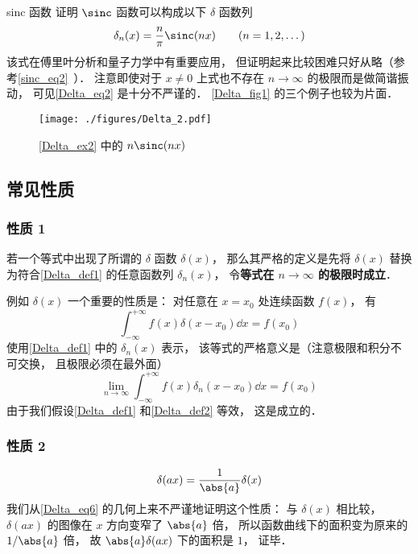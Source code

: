 \begin{example}{sinc 函数}\label{Delta_ex2}
证明 $\sinc$ 函数可以构成以下 $\delta$ 函数列
\begin{equation}\label{Delta_eq10}
\delta_n(x) = \frac{n}{\pi}\sinc(n x) \qquad (n = 1, 2, \dots)
\end{equation}
该式在傅里叶分析和量子力学中有重要应用\cite{Arfken}， 但证明起来比较困难只好从略（参考\autoref{sinc_eq2}~）． 注意即使对于 $x \ne 0$ 上式也不存在 $n\to\infty$ 的极限而是做简谐振动， 可见\autoref{Delta_eq2} 是十分不严谨的． \autoref{Delta_fig1} 的三个例子也较为片面．
\end{example}
\begin{figure}[ht]
\centering
\texttt{[image: ./figures/Delta\_2.pdf]}
\caption{\autoref{Delta_ex2} 中的 $n\sinc(n x)$} \label{Delta_fig2}
\end{figure}

\subsection{常见性质}
\subsubsection{性质 1}
若一个等式中出现了所谓的 $\delta$ 函数 $\delta(x)$， 那么其严格的定义是先将 $\delta(x)$ 替换为符合\autoref{Delta_def1} 的任意函数列 $\delta_n(x)$， 令\textbf{等式在 $n\to\infty$ 的极限时成立}．

例如 $\delta(x)$ 一个重要的性质是： 对任意在 $x = x_0$ 处连续函数 $f(x)$， 有
\begin{equation}\label{Delta_eq7}
\int_{-\infty}^{+\infty} f(x) \delta(x - x_0) \dd{x}= f(x_0)
\end{equation}
使用\autoref{Delta_def1} 中的 $\delta_n(x)$ 表示， 该等式的严格意义是（注意极限和积分不可交换， 且极限必须在最外面）
\begin{equation}\label{Delta_eq11}
\lim_{n\to\infty}\int_{-\infty}^{+\infty} f(x) \delta_n(x - x_0) \dd{x}= f(x_0)
\end{equation}
由于我们假设\autoref{Delta_def1} 和\autoref{Delta_def2} 等效， 这是成立的．

\subsubsection{性质 2}
\begin{equation}\label{Delta_eq1}
\delta(ax) = \frac{1}{\abs{a}} \delta(x)
\end{equation}
我们从\autoref{Delta_eq6} 的几何上来不严谨地证明这个性质： 与 $\delta(x)$ 相比较， $\delta(ax)$ 的图像在 $x$ 方向变窄了 $\abs{a}$ 倍， 所以函数曲线下的面积变为原来的 $1/\abs{a}$ 倍， 故 $\abs{a}\delta(ax)$ 下的面积是 $1$， 证毕．

